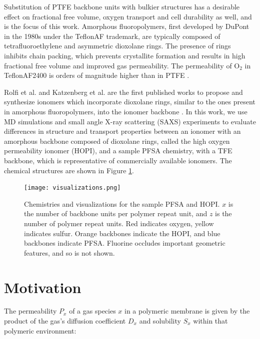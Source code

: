 \documentclass[journal=jacsat,manuscript=article]{achemso}
\begin{document}
Substitution of PTFE backbone units with bulkier structures has a desirable effect on fractional free volume, oxygen transport and cell durability as well\cite{braaten_integration_2022,rolfi_new_2018,jinnouchi_role_2021}, and is the focus of this work. Amorphous fluoropolymers, first developed by DuPont in the 1980s under the Teflon\texttrademark AF trademark, are typically composed of tetrafluoroethylene and asymmetric dioxolane rings. The presence of rings inhibits chain packing, which prevents crystallite formation and results in high fractional free volume \cite{Resnick_Buck_2000} and improved gas permeability. The permeability of O$_2$ in Teflon\texttrademark AF2400 is orders of magnitude higher than in PTFE \cite{Alentiev_Shantarovich_Merkel_Bondar_Freeman_Yampolskii_2002, Merkel_Bondar_Nagai_Freeman_Yampolskii_1999}. 

Rolfi et al. and Katzenberg et al. are the first published works to propose and synthesize ionomers which incorporate dioxolane rings, similar to the ones present in amorphous fluoropolymers, into the ionomer backbone \cite{rolfi_new_2018,katzenberg_highly_2020}. In this work, we use MD simulations and small angle X-ray scattering (SAXS) experiments to evaluate differences in structure and transport properties between an ionomer with an amorphous backbone composed of dioxolane rings, called the high oxygen permeability ionomer (HOPI), and a sample PFSA chemistry, with a TFE backbone, which is representative of commercially available ionomers. The chemical structures are shown in Figure \ref{fig:chemcomp}. 

\begin{figure}[h!]
  \texttt{[image: visualizations.png]}
  \centering
  \caption{Chemistries and visualizations for the sample PFSA and HOPI. $x$ is the number of backbone units per polymer repeat unit, and $z$ is the number of polymer repeat units. Red indicates oxygen, yellow indicates sulfur. Orange backbones indicate the HOPI, and blue backbones indicate PFSA. Fluorine occludes important geometric features, and so is not shown.}
\label{fig:chemcomp}
\end{figure}


\section{Motivation}
The permeability $P_x$ of a gas species $x$ in a polymeric membrane is given by the product of the gas's diffusion coefficient $D_x$ and solubility $S_x$ within that polymeric environment:
\end{document}
